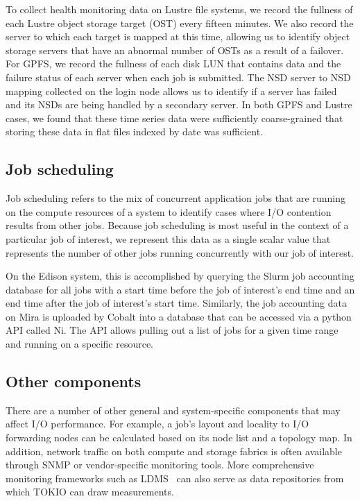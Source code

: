 To collect health monitoring data on Lustre file systems, we record the fullness of each Lustre object storage target (OST) every fifteen minutes.
We also record the server to which each target is mapped at this time, allowing us to identify object storage servers that have an abnormal number of OSTs as a result of a failover.
For GPFS, we record the fullness of each disk LUN that contains data and the failure status of each server when each job is submitted.
The NSD server to NSD mapping collected on the login node allows us to identify if a server has failed and its NSDs are being handled by a secondary server.
In both GPFS and Lustre cases, we found that these time series data were sufficiently coarse-grained that storing these data in flat files indexed by date was sufficient.

\subsection{Job scheduling} \label{sec:methods/scheduling}

Job scheduling refers to the mix of concurrent application jobs that are running on the compute resources of a system to identify cases where I/O contention results from other jobs.
Because job scheduling is most useful in the context of a particular job of interest, we represent this data as a single scalar value that represents the number of other jobs running concurrently with our job of interest.

On the Edison system, this is accomplished by querying the Slurm job accounting database for all jobs with a start time before the job of interest's end time and an end time after the job of interest's start time.
Similarly, the job accounting data on Mira is uploaded by Cobalt into a database that can be accessed via a python API called Ni.
The API allows pulling out a list of jobs for a given time range and running on a specific resource.

\subsection{Other components} \label{sec:methods/other}

There are a number of other general and system-specific components that may affect I/O performance.  For example, a job's layout and locality to I/O forwarding nodes can be calculated based on its node list and a topology map.
In addition, network traffic on both compute and storage fabrics is often available through SNMP or vendor-specific monitoring tools.
More comprehensive monitoring frameworks such as LDMS~\cite{7013000} can also serve as data repositories from which TOKIO can draw measurements.

